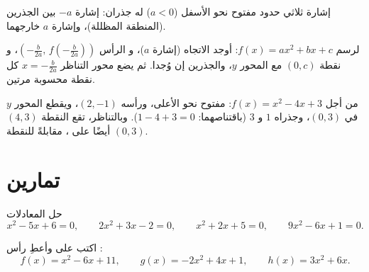 \begin{omfigure}

{\small إشارة ثلاثي حدود مفتوح نحو الأسفل ($a < 0$) له جذران: إشارة
$-a$ بين الجذرين (المنطقة المظللة)، وإشارة $a$ خارجهما.}
\end{omfigure}

\begin{method}\label{met:g11:quad:reading}
لرسم $f(x) = ax^2+bx+c$: أوجد الاتجاه (إشارة $a$)، و
الرأس $\left(-\frac{b}{2a},\, f\!\left(-\frac{b}{2a}\right)\right)$، و
نقطة  $(0, c)$ مع المحور $y$، والجذرين إن وُجدا. ثم يضع محور
التناظر $x = -\frac{b}{2a}$ كل نقطة محسوبة مرتين.
\end{method}

\begin{example}
من أجل $f(x) = x^2 - 4x + 3$: مفتوح نحو الأعلى، ورأسه $(2, -1)$، ويقطع المحور $y$
في $(0,3)$، وجذراه $1$ و $3$ (باقتناصهما: $1 - 4 + 3 = 0$). وبالتناظر، تقع
النقطة $(4, 3)$ أيضًا على ، مقابلةً للنقطة $(0, 3)$.
\end{example}

\section{تمارين}

\begin{exercise}[$\star$]\label{exo:g11:quad:1}
حل المعادلات
\[
x^2 - 5x + 6 = 0, \qquad
2x^2 + 3x - 2 = 0, \qquad
x^2 + 2x + 5 = 0, \qquad
9x^2 - 6x + 1 = 0 .
\]
\end{exercise}

\begin{exercise}[$\star$]\label{exo:g11:quad:2}
اكتب على  وأعطِ رأس :
\[
f(x) = x^2 - 6x + 11, \qquad
g(x) = -2x^2 + 4x + 1, \qquad
h(x) = 3x^2 + 6x .
\]
\end{exercise}

